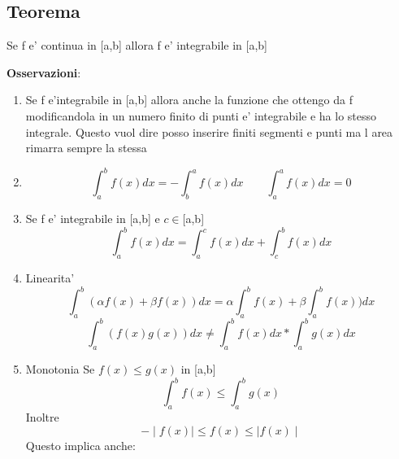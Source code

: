 \documentclass{article}
\begin{document}
        \subsection{Teorema}
        \begin{flushleft}
          Se f e' continua in [a,b] allora f e' integrabile in [a,b]
        \end{flushleft}
        \begin{flushleft}
          \textbf{Osservazioni}:
          \begin{enumerate}
            \item Se f e'integrabile in [a,b] allora anche la funzione che ottengo da f modificandola in un numero finito di punti
              e' integrabile e ha lo stesso integrale. Questo vuol dire posso inserire finiti segmenti e punti ma l area rimarra sempre la stessa
            \item 
              \begin{equation}
                \int_a^b f(x)dx = -\int_b^a f(x)dx \quad \quad  \int_a^a f(x)dx=0
              \end{equation}
            \item Se f e' integrabile in [a,b] e $c \in $[a,b]
              \begin{equation}
                \int_a^b f(x)dx = \int_a^c f(x)dx +\int_c^b f(x)dx 
              \end{equation}
            \item Linearita'
              \begin{equation}
                \int_a^b (\alpha f(x)+ \beta f(x))dx=\alpha \int_a^b f(x)+ \beta \int_a^b f(x))dx
              \end{equation}
              \begin{equation}
                \int_a^b (f(x)g(x))dx \neq \int_a^b f(x)dx * \int_a^b g(x)dx 
              \end{equation}
            \item Monotonia
              Se $f(x) \leq g(x)$ in [a,b]
              \begin{equation}
                \int_a^b f(x) \leq \int_a^b g(x)
              \end{equation}
              Inoltre
              \begin{equation}
                -\mid f(x) \mid \leq f(x) \leq \mid f(x) \mid
              \end{equation}
              Questo implica anche:
              \begin{equation}

\end{equation}
\end{enumerate}
\end{flushleft}
\end{document}
